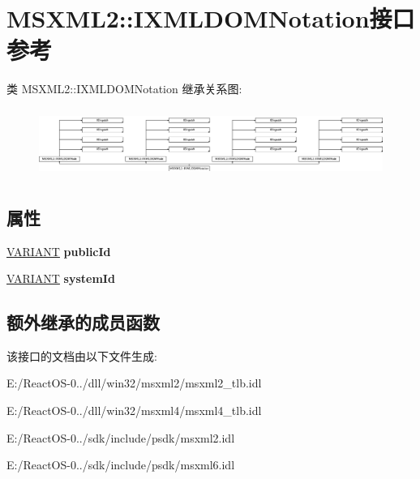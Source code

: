 \hypertarget{interface_m_s_x_m_l2_1_1_i_x_m_l_d_o_m_notation}{}\section{M\+S\+X\+M\+L2\+:\+:I\+X\+M\+L\+D\+O\+M\+Notation接口 参考}
\label{interface_m_s_x_m_l2_1_1_i_x_m_l_d_o_m_notation}
类 M\+S\+X\+M\+L2\+:\+:I\+X\+M\+L\+D\+O\+M\+Notation 继承关系图\+:\begin{figure}[H]
\begin{center}
\leavevmode
\includegraphics[height=2.270270cm]{interface_m_s_x_m_l2_1_1_i_x_m_l_d_o_m_notation}
\end{center}
\end{figure}
\subsection*{属性}
\begin{DoxyCompactItemize}
\item 
\mbox{\label{interface_m_s_x_m_l2_1_1_i_x_m_l_d_o_m_notation_aeef06b0db03a608b93ce281cd27159a8}} 
\hyperlink{structtag_v_a_r_i_a_n_t}{V\+A\+R\+I\+A\+NT} {\bfseries public\+Id}
\item 
\mbox{\label{interface_m_s_x_m_l2_1_1_i_x_m_l_d_o_m_notation_a8304bbc1a01732b444d79316ecc363c2}} 
\hyperlink{structtag_v_a_r_i_a_n_t}{V\+A\+R\+I\+A\+NT} {\bfseries system\+Id}
\end{DoxyCompactItemize}
\subsection*{额外继承的成员函数}


该接口的文档由以下文件生成\+:\begin{DoxyCompactItemize}
\item 
E\+:/\+React\+O\+S-\/0../dll/win32/msxml2/msxml2\+\_\+tlb.\+idl\item 
E\+:/\+React\+O\+S-\/0../dll/win32/msxml4/msxml4\+\_\+tlb.\+idl\item 
E\+:/\+React\+O\+S-\/0../sdk/include/psdk/msxml2.\+idl\item 
E\+:/\+React\+O\+S-\/0../sdk/include/psdk/msxml6.\+idl\end{DoxyCompactItemize}
